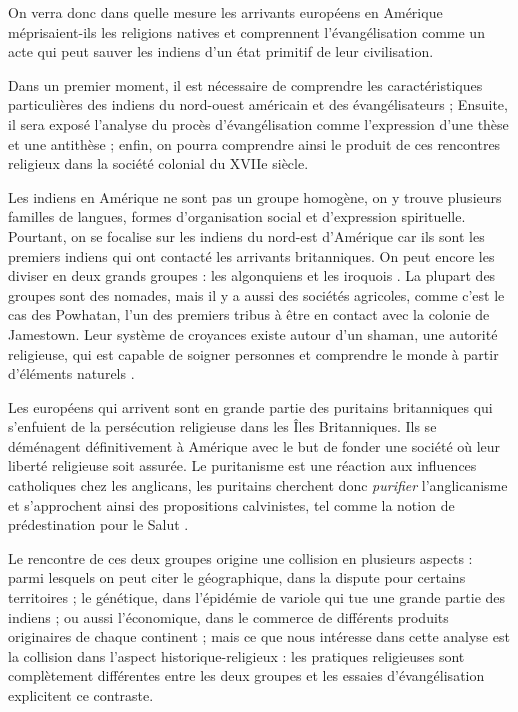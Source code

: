 \documentclass{article}
\begin{document}
On verra donc dans quelle mesure les arrivants européens en Amérique méprisaient-ils les religions natives et comprennent l'évangélisation comme un acte qui peut sauver les indiens d'un état primitif de leur civilisation.

Dans un premier moment, il est nécessaire de comprendre les caractéristiques particulières des indiens du nord-ouest américain et des évangélisateurs ; Ensuite, il sera exposé l'analyse du procès d'évangélisation comme l'expression d'une thèse et une antithèse ; enfin, on pourra comprendre ainsi le produit de ces rencontres religieux dans la société colonial du XVIIe siècle.

Les indiens en Amérique ne sont pas un groupe homogène, on y trouve plusieurs familles de langues, formes d'organisation social et d'expression spirituelle. Pourtant, on se focalise sur les indiens du nord-est d'Amérique car ils sont les premiers indiens qui ont contacté les arrivants britanniques. On peut encore les diviser en deux grands groupes : les algonquiens et les iroquois \cite{britt-2}. La plupart des groupes sont des nomades, mais il y a aussi des sociétés agricoles, comme c'est le cas des Powhatan, l'un des premiers tribus à être en contact avec la colonie de Jamestown. Leur système de croyances existe autour d'un shaman, une autorité religieuse, qui est capable de soigner personnes et comprendre le monde à partir d'éléments naturels \cite{poter-3}.

Les européens qui arrivent sont en grande partie des puritains britanniques qui s'enfuient de la persécution religieuse dans les Îles Britanniques. Ils se déménagent définitivement à Amérique avec le but de fonder une société où leur liberté religieuse soit assurée. Le puritanisme est une réaction aux influences catholiques chez les anglicans, les puritains cherchent donc \emph{purifier} l'anglicanisme et s'approchent ainsi des propositions calvinistes, tel comme la notion de prédestination pour le Salut \cite{britt2-4}.

Le rencontre de ces deux groupes origine une collision en plusieurs aspects : parmi lesquels on peut citer le géographique, dans la dispute pour certains territoires ; le génétique, dans l'épidémie de variole qui tue une grande partie des indiens ; ou aussi l'économique, dans le commerce de différents produits originaires de chaque continent ; mais ce que nous intéresse dans cette analyse est la collision dans l'aspect historique-religieux : les pratiques religieuses sont complètement différentes entre les deux groupes et les essaies d'évangélisation explicitent ce contraste.
\end{document}
